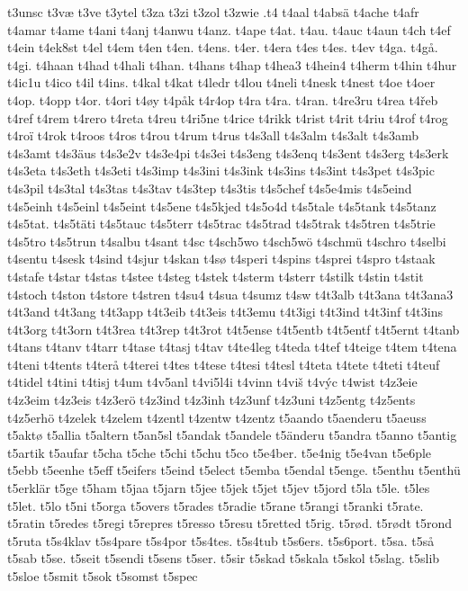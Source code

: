 {{t3unsc
t3væ
t3ve
t3ytel
t3za
t3zi
t3zol
t3zwie
.t4
t4aal
t4absä
t4ache
t4afr
t4amar
t4ame
t4ani
t4anj
t4anwu
t4anz.
t4ape
t4at.
t4au.
t4auc
t4aun
t4ch
t4ef
t4ein
t4ek8st
t4el
t4em
t4en
t4en.
t4ens.
t4er.
t4era
t4es
t4es.
t4ev
t4ga.
t4gå.
t4gi.
t4haan
t4had
t4hali
t4han.
t4hans
t4hap
t4hea3
t4hein4
t4herm
t4hin
t4hur
t4ic1u
t4ico
t4il
t4ins.
t4kal
t4kat
t4ledr
t4lou
t4neli
t4nesk
t4nest
t4oe
t4oer
t4op.
t4opp
t4or.
t4ori
t4øy
t4påk
t4r4op
t4ra
t4ra.
t4ran.
t4re3ru
t4rea
t4řeb
t4ref
t4rem
t4rero
t4reta
t4reu
t4ri5ne
t4rice
t4rikk
t4rist
t4rit
t4riu
t4rof
t4rog
t4roï
t4rok
t4roos
t4ros
t4rou
t4rum
t4rus
t4s3all
t4s3alm
t4s3alt
t4s3amb
t4s3amt
t4s3äus
t4s3e2v
t4s3e4pi
t4s3ei
t4s3eng
t4s3enq
t4s3ent
t4s3erg
t4s3erk
t4s3eta
t4s3eth
t4s3eti
t4s3imp
t4s3ini
t4s3ink
t4s3ins
t4s3int
t4s3pet
t4s3pic
t4s3pil
t4s3tal
t4s3tas
t4s3tav
t4s3tep
t4s3tis
t4s5chef
t4s5e4mis
t4s5eind
t4s5einh
t4s5einl
t4s5eint
t4s5ene
t4s5kjed
t4s5o4d
t4s5tale
t4s5tank
t4s5tanz
t4s5tat.
t4s5täti
t4s5tauc
t4s5terr
t4s5trac
t4s5trad
t4s5trak
t4s5tren
t4s5trie
t4s5tro
t4s5trun
t4salbu
t4sant
t4sc
t4sch5wo
t4sch5wö
t4schmü
t4schro
t4selbi
t4sentu
t4sesk
t4sind
t4sjur
t4skan
t4sø
t4speri
t4spins
t4sprei
t4spro
t4staak
t4stafe
t4star
t4stas
t4stee
t4steg
t4stek
t4sterm
t4sterr
t4stilk
t4stin
t4stit
t4stoch
t4ston
t4store
t4stren
t4su4
t4sua
t4sumz
t4sw
t4t3alb
t4t3ana
t4t3ana3
t4t3and
t4t3ang
t4t3app
t4t3eib
t4t3eis
t4t3emu
t4t3igi
t4t3ind
t4t3inf
t4t3ins
t4t3org
t4t3orn
t4t3rea
t4t3rep
t4t3rot
t4t5ense
t4t5entb
t4t5entf
t4t5ernt
t4tanb
t4tans
t4tanv
t4tarr
t4tase
t4tasj
t4tav
t4te4leg
t4teda
t4tef
t4teige
t4tem
t4tena
t4teni
t4tents
t4terå
t4terei
t4tes
t4tese
t4tesi
t4tesl
t4teta
t4tete
t4teti
t4teuf
t4tidel
t4tini
t4tisj
t4um
t4v5anl
t4vi5l4i
t4vinn
t4viš
t4výc
t4wist
t4z3eie
t4z3eim
t4z3eis
t4z3erö
t4z3ind
t4z3inh
t4z3unf
t4z3uni
t4z5entg
t4z5ents
t4z5erhö
t4zelek
t4zelem
t4zentl
t4zentw
t4zentz
t5aando
t5aenderu
t5aeuss
t5aktø
t5allia
t5altern
t5an5sl
t5andak
t5andele
t5änderu
t5andra
t5anno
t5antig
t5artik
t5aufar
t5cha
t5che
t5chi
t5chu
t5co
t5e4ber.
t5e4nig
t5e4van
t5e6ple
t5ebb
t5eenhe
t5eff
t5eifers
t5eind
t5elect
t5emba
t5endal
t5enge.
t5enthu
t5enthü
t5erklär
t5ge
t5ham
t5jaa
t5jarn
t5jee
t5jek
t5jet
t5jev
t5jord
t5la
t5le.
t5les
t5let.
t5lo
t5ni
t5orga
t5overs
t5rades
t5radie
t5rane
t5rangi
t5ranki
t5rate.
t5ratin
t5redes
t5regi
t5repres
t5resso
t5resu
t5retted
t5rig.
t5rød.
t5rødt
t5rond
t5ruta
t5s4klav
t5s4pare
t5s4por
t5s4tes.
t5s4tub
t5s6ers.
t5s6port.
t5sa.
t5så
t5sab
t5se.
t5seit
t5sendi
t5sens
t5ser.
t5sir
t5skad
t5skala
t5skol
t5slag.
t5slib
t5sloe
t5smit
t5sok
t5somst
t5spec
}}
